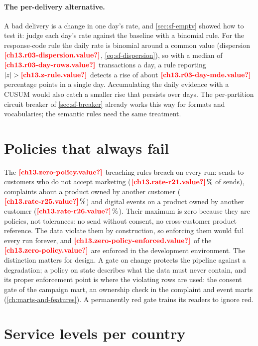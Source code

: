 \paragraph{The per-delivery alternative.} A bad delivery is a change in one day's rate, and \cref{sec:sf-empty} showed how
to test it: judge each day's rate against the baseline with a binomial rule. For the response-code rule the daily rate is
binomial around a common value (dispersion $\est{ch13.r03-dispersion}{value}$, \cref{eq:sf-dispersion}), so with a median of
$\est{ch13.r03-day-rows}{value}$ transactions a day, a rule reporting $\lvert z \rvert > \est{ch13.z-rule}{value}$ detects a rise of
about $\est{ch13.r03-day-mde}{value}$ percentage points in a single day. Accumulating the daily evidence with a CUSUM
\autocite{page1954} would also catch a smaller rise that persists over days. The per-partition circuit breaker of
\cref{sec:sf-breaker} already works this way for formats and vocabularies; the semantic rules need the same treatment.



\section{Policies that always fail}\label{sec:ag-policy}

The $\est{ch13.zero-policy}{value}$ breaching rules breach on every run: sends to customers who do not accept marketing ($\est{ch13.rate-r21}{value}\,\%$ of sends),
complaints about a product owned by another customer ($\est{ch13.rate-r25}{value}\,\%$) and digital events on a product owned by
another customer ($\est{ch13.rate-r26}{value}\,\%$). Their maximum is zero because they are policies, not tolerances: no send
without consent, no cross-customer product reference. The data violate them by construction, so enforcing them would fail
every run forever, and $\est{ch13.zero-policy-enforced}{value}$ of the $\est{ch13.zero-policy}{value}$ are enforced in the
development environment. The distinction matters for design. A gate on change protects the pipeline against a degradation;
a policy on state describes what the data must never contain, and its proper enforcement point is where the violating rows
are used: the consent gate of the campaign mart, an ownership check in the complaint and event marts
(\cref{ch:marts-and-features}). A permanently red gate trains its readers to ignore red.

\section{Service levels per country}\label{sec:ag-countries}

